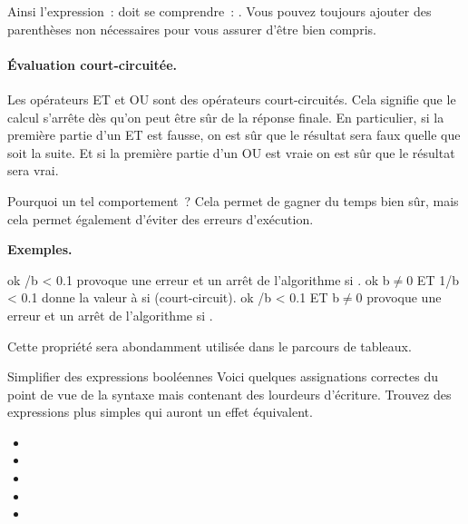 				Ainsi l’expression~: 
				doit se comprendre~: .
				Vous pouvez toujours ajouter des parenthèses non nécessaires
				pour vous assurer d’être bien compris.

			\paragraph{Évaluation court-circuitée.}\label{court-circuit}
			
				Les opérateurs ET et OU sont des opérateurs court-circuités.
				Cela signifie que le calcul s’arrête dès qu’on peut être sûr
				de la réponse finale.
				En particulier, si la première partie d’un ET est fausse,
				on est sûr que le résultat sera faux quelle que soit la suite.
				Et si la première partie d’un OU est vraie 
				on est sûr que le résultat sera vrai.
				
				Pourquoi un tel comportement~?
				Cela permet de gagner du temps bien sûr,
				mais cela permet également d’éviter des erreurs d’exécution.
				 
				\textbf{Exemples.}
				\begin{LDA}
					\Let ok /b < 0.1
						\RComment provoque une erreur et un arrêt
						de l’algorithme si . 
					\Let ok \Gets b$\neq$0 ET 1/b < 0.1
						\RComment donne la valeur  à  
						si  (court-circuit). 
					\Let ok /b < 0.1 ET b$\neq$0
						\RComment provoque une erreur et un arrêt
						de l’algorithme si . 
				\end{LDA}
				
				Cette propriété sera abondamment utilisée dans le parcours
				de tableaux.
				
			\begin{Exercice}{Simplifier des expressions booléennes}
				Voici quelques assignations correctes du point de vue de la
				syntaxe mais contenant des lourdeurs d’écriture.
				Trouvez des expressions plus simples
				qui auront un effet équivalent.
				\begin{itemize}
					\item {}
					\item {}
					\item {}
					\item {}
					\item {}
				\end{itemize}		
			\end{Exercice}
		
